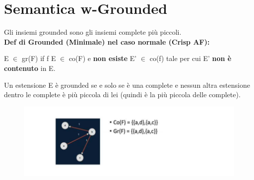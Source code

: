     \section{Semantica w-Grounded}
    Gli insiemi grounded sono gli insiemi complete più piccoli. \\\textbf{Def di
        Grounded (Minimale) nel caso normale (Crisp AF):}
    \begin{center}
        E $\in$ gr(F) if f E $\in$ co(F) e \textbf{non esiste} E' $\in$ co(f)
        tale per cui E' \textbf{non è contenuto} in E.
    \end{center}
    Un estensione E è grounded se e solo se è una complete e nessun altra
    estensione dentro le complete è più piccola di lei (quindi è la più piccola
    delle complete).
    \begin{figure}[H]
        \centering
        \includegraphics[width=14cm, keepaspectratio]{img/Cap6/w-grounded.png}
    \end{figure}

